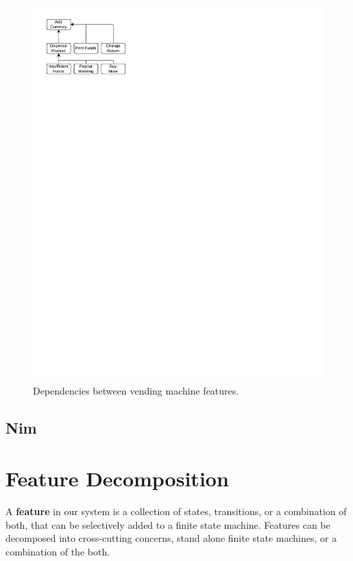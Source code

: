 \documentclass[sigplan,anonymous,review]{acmart}
\begin{document}
\begin{figure}[h]
    \centering
    \includegraphics{figures/VendingMachine.pdf}
    \caption{Dependencies between vending machine features.}
    \label{fig:vmDependencies}
\end{figure}

\subsection{Nim}

\section{Feature Decomposition}\label{sec:decomp}
A \textbf{feature} in our system is a collection of states, transitions, or a combination of both, that can be selectively added to a finite state machine. Features can be decomposed into cross-cutting concerns, stand alone finite state machines, or a combination of the both. 
\end{document}
